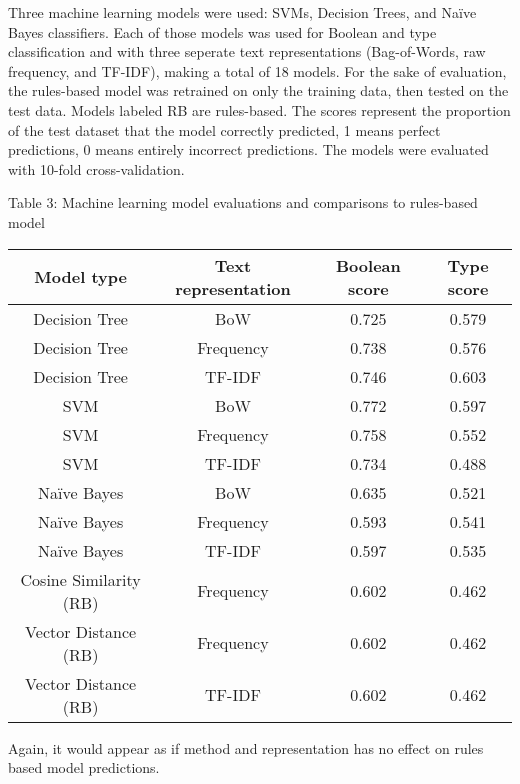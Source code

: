 \documentclass{article}
\begin{document}
Three machine learning models were used: SVMs, Decision Trees, and Naïve Bayes classifiers. Each of those models was used for Boolean and type classification and with three seperate text representations (Bag-of-Words, raw frequency, and TF-IDF), making a total of 18 models. For the sake of evaluation, the rules-based model was retrained on only the training data, then tested on the test data. Models labeled RB are rules-based. The scores represent the proportion of the test dataset that the model correctly predicted, 1 means perfect predictions, 0 means entirely incorrect predictions. The models were evaluated with 10-fold cross-validation.
\begin{center}
Table 3: Machine learning model evaluations and comparisons to rules-based model
\begin{tabular}{ |c|c|c|c| }
\hline {\bf Model type} & {\bf Text representation} & {\bf Boolean score} & {\bf Type score} \\
\hline Decision Tree & BoW & 0.725 &  0.579\\
\hline Decision Tree & Frequency & 0.738  &  0.576\\
\hline Decision Tree & TF-IDF & 0.746 & 0.603\\
\hline SVM & BoW & 0.772 & 0.597\\
\hline SVM & Frequency & 0.758 & 0.552\\
\hline SVM & TF-IDF & 0.734 & 0.488\\
\hline Naïve Bayes & BoW & 0.635 & 0.521\\
\hline Naïve Bayes & Frequency & 0.593 & 0.541\\
\hline Naïve Bayes & TF-IDF & 0.597 & 0.535\\
\hline Cosine Similarity (RB) & Frequency & 0.602 & 0.462\\
\hline Vector Distance (RB) & Frequency & 0.602 & 0.462\\
\hline Vector Distance (RB) & TF-IDF & 0.602 & 0.462\\
\hline
\end{tabular}
\end{center}

Again, it would appear as if method and representation has no effect on rules based model predictions.
\end{document}
